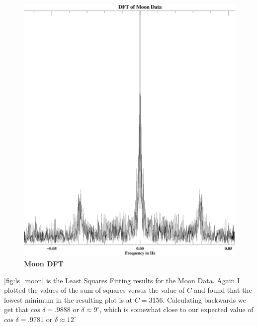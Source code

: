 \documentclass{article}
\begin{document}
\begin{figure}[h!]
 \begin{center}
    \includegraphics[width=5.5in]{moon_dft.ps}
    \caption{\bf{Moon DFT}}
    \label{fig:moon_dft}
     \end{center}
    \end{figure}
  
\autoref{fig:ls_moon} is the Least Squares Fitting results for the Moon Data.  Again I plotted the values of the sum-of-squares versus the value of $C$ and found that the lowest minimum in the resulting plot is at $C=3156$. Calculating backwards we get that $cos\; \delta = .9888$ or $\delta\approx9^\circ$, which is somewhat close to our expected value of $cos\;\delta=.9781$ or $\delta\approx12^\circ$
    
\end{document}

